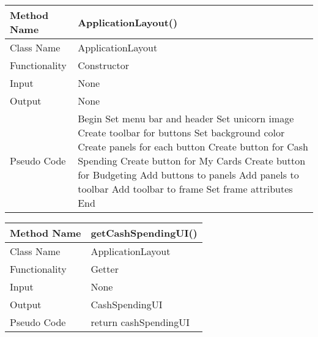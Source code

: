 \documentclass{article}
\newcommand\tab[1][1cm]{\hspace*{#1}}
\begin{document}
\begin{table}[]
\begin{tabular}{|p{2cm}||p{1.5cm}||p{6cm}||p{3cm}||p{3cm}|}
\end{tabular}
\end{table}


\begin{center}
\begin{tabular}{|p{2.5cm}||p{10cm}|}
\hline
Method Name & ApplicationLayout() \\
\hline
Class Name & ApplicationLayout \\
\hline
Functionality & Constructor\\
\hline

Input & None\\
\hline
Output & None\\
\hline

Pseudo Code & Begin\newline
\tab Set menu bar and header\newline
\tab Set unicorn image\newline
\tab Create toolbar for buttons\newline
\tab Set background color\newline
\tab Create panels for each button \newline
\tab Create button for Cash Spending\newline
\tab Create button for My Cards \newline
\tab Create button for Budgeting\newline
\tab Add buttons to panels\newline
\tab Add panels to toolbar\newline
\tab Add toolbar to frame\newline
\tab Set frame attributes\newline
End

\\
\hline
\end{tabular}
\end{center}

\begin{center}
\begin{tabular}{|p{2.5cm}||p{10cm}|}
\hline
Method Name & getCashSpendingUI() \\
\hline
Class Name & ApplicationLayout \\
\hline
Functionality & Getter\\
\hline

Input & None\\
\hline
Output & CashSpendingUI\\
\hline

Pseudo Code & return cashSpendingUI\\
\hline
\end{tabular}
\end{center}
\end{document}
